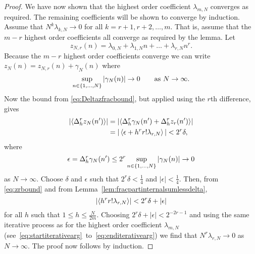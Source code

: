 \documentclass[journal]{IEEEtran}
\begin{document}
\begin{proof}
We have now shown that the highest order coefficient $\lambda_{m,N}$ converges as required. The remaining coefficients will be shown to converge by induction.  Assume that $N^k \lambda_{k,N} \rightarrow 0$ for all $k=r+1, r+2, \dots, m$.  That is, assume that the $m-r$ highest order coefficients all converge as required by the lemma. Let
\[
z_{N,r}(n) = \lambda_{0,N} + \lambda_{1,N} n + \dots + \lambda_{r,N} n^r.
\]
Because the $m-r$ highest order coefficients converge we can write $z_N(n) = z_{N,r}(n) + \gamma_N(n)$ where 
\[
\sup_{n\in\{1,\dots,N\}}\left\vert \gamma_N(n) \right\vert \rightarrow 0 \qquad \text{as $N\rightarrow\infty$}. 
\]
Now the bound from \eqref{eq:Deltazfracbound}, but applied using the $r$th difference, gives
 \begin{equation}\label{eq:zrbound}
\begin{split}
\left|\left\langle   \Delta_h^r z_N(n') \right\rangle\right| &= \left|\left\langle   \Delta_h^r\gamma_N(n') + \Delta_h^r z_r(n')  \right\rangle\right| 
\\ &= |\left\langle  \epsilon + h^r r! \lambda_{r,N}  \right\rangle| < 2^r\delta,
\end{split}
 \end{equation}
 where
\[
\epsilon = \Delta_h^r \gamma_N(n') \leq 2^r \sup_{n\in\{1,\dots,N\}}\left\vert \gamma_N(n) \right\vert \rightarrow 0
\] 
as $N\rightarrow\infty$.  Choose $\delta$ and $\epsilon$ such that $2^r\delta < \tfrac{1}{4}$ and $|\epsilon| < \tfrac{1}{4}$.  Then, from \eqref{eq:zrbound} and from Lemma~\ref{lem:fracpartinternalsumlessdelta},
\[
\left\vert \left\langle  h^r r! \lambda_{r,N}  \right\rangle \right\vert < 2^r\delta + \left\vert \epsilon \right\vert
\]
for all $h$ such that $1 \leq h \leq \tfrac{N}{2m}$.  Choosing $2^r\delta + |\epsilon| < 2^{-2r-1}$ and using the same iterative process as for the highest order coefficient $\lambda_{m,N}$  (see~\eqref{eq:startiterativearg}~to~\eqref{eq:enditerativearg}) we find that $N^r \lambda_{r,N} \rightarrow 0$ as $N\rightarrow\infty$.  The proof now follows by induction.
 \end{proof}

\end{document}
